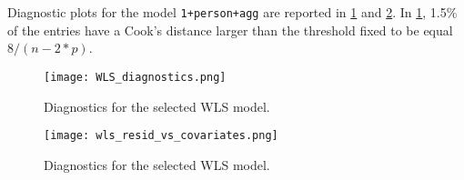 \documentclass[a4paper, 12pt,oneside]{article}
\begin{document}
			Diagnostic plots for the model \texttt{1+person+agg} are reported in \ref{fig:wls-diagnostic} and \ref{fig:wls-diagnostic-time-coefs}. In \ref{fig:wls-diagnostic}, 1.5\% of the entries have a Cook's distance larger than the threshold fixed to be equal $8/(n-2*p)$. 

			\begin{figure}[htb]
				\centering
				\texttt{[image: WLS\_diagnostics.png]}
				\caption{Diagnostics for the selected WLS model.}
				\label{fig:wls-diagnostic}
			\end{figure}


			\begin{figure}[htb]
				\centering
				\texttt{[image: wls\_resid\_vs\_covariates.png]}
				\caption{Diagnostics for the selected WLS model.}
				\label{fig:wls-diagnostic-time-coefs}
			\end{figure}
\end{document}
